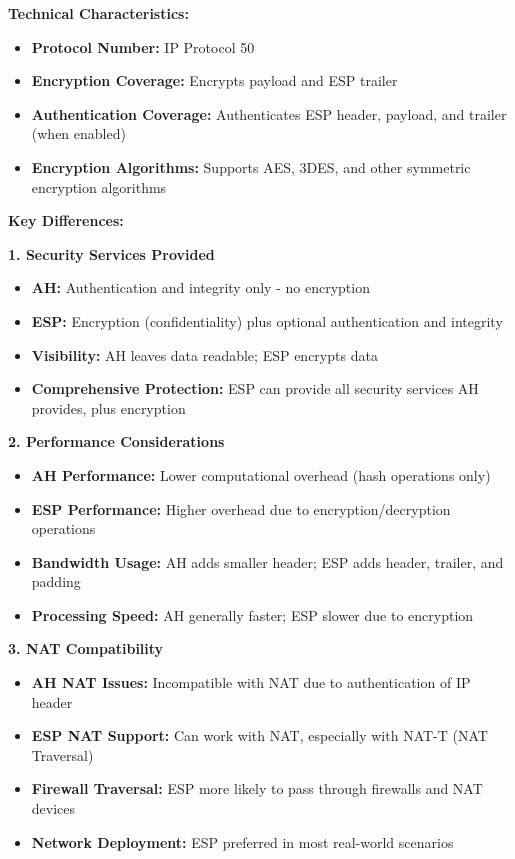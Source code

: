 \documentclass[12pt,a4paper]{article}
\begin{document}
\textbf{Technical Characteristics:}
\begin{itemize}
    \item \textbf{Protocol Number:} IP Protocol 50
    \item \textbf{Encryption Coverage:} Encrypts payload and ESP trailer
    \item \textbf{Authentication Coverage:} Authenticates ESP header, payload, and trailer (when enabled)
    \item \textbf{Encryption Algorithms:} Supports AES, 3DES, and other symmetric encryption algorithms
\end{itemize}

\textbf{Key Differences:}

\textbf{1. Security Services Provided}
\begin{itemize}
    \item \textbf{AH:} Authentication and integrity only - no encryption
    \item \textbf{ESP:} Encryption (confidentiality) plus optional authentication and integrity
    \item \textbf{Visibility:} AH leaves data readable; ESP encrypts data
    \item \textbf{Comprehensive Protection:} ESP can provide all security services AH provides, plus encryption
\end{itemize}

\textbf{2. Performance Considerations}
\begin{itemize}
    \item \textbf{AH Performance:} Lower computational overhead (hash operations only)
    \item \textbf{ESP Performance:} Higher overhead due to encryption/decryption operations
    \item \textbf{Bandwidth Usage:} AH adds smaller header; ESP adds header, trailer, and padding
    \item \textbf{Processing Speed:} AH generally faster; ESP slower due to encryption
\end{itemize}

\textbf{3. NAT Compatibility}
\begin{itemize}
    \item \textbf{AH NAT Issues:} Incompatible with NAT due to authentication of IP header
    \item \textbf{ESP NAT Support:} Can work with NAT, especially with NAT-T (NAT Traversal)
    \item \textbf{Firewall Traversal:} ESP more likely to pass through firewalls and NAT devices
    \item \textbf{Network Deployment:} ESP preferred in most real-world scenarios
\end{itemize}
\end{document}
